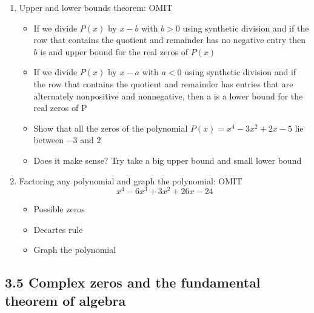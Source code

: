 \documentclass{article}
\begin{document}
\begin{enumerate}
\item Upper and lower bounds theorem: OMIT
\begin{itemize}
\item If we divide $P(x)$ by $x-b$ with $b>0$ using synthetic division and if the row that contains the quotient and remainder has no negative entry then $b$ is and upper bound for the real zeros of $P(x)$
\item If we divide $P(x)$ by $x-a$ with $a<0$ using synthetic division and if the row that contains the quotient and remainder has entries that are alternately nonpositive and nonnegative, then a is a lower bound for the real zeros of P
\item Show that all the zeros of the polynomial $P(x) = x^4-3x^2+2x-5$ lie between $-3$ and $2$
\item Does it make sense? Try take a big upper bound and small lower bound
\end{itemize}

\item Factoring any polynomial and graph the polynomial: OMIT
$$
x^4-6x^3+3x^2 + 26x-24
$$
\begin{itemize}
\item Possible zeros
\item Decartes rule
\item Graph the polynomial
\end{itemize}
\end{enumerate}

\subsection{3.5 Complex zeros and the fundamental theorem of algebra}
\end{document}
